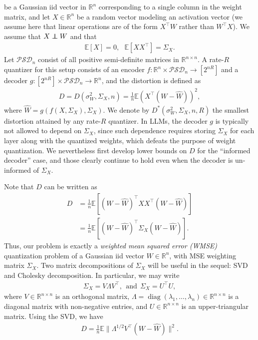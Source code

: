\documentclass[journal]{IEEEtran}
\newcommand{\RR}{\mathbb{R}}
\newcommand{\diag}{\mathop{\mathrm{diag}}}
\newcommand\indep{\protect\mathpalette{\protect\independenT}{\perp}}
\def\independenT#1#2{\mathrel{\rlap{$#1#2$}\mkern2mu{#1#2}}}
\def\EE{\mathbb{E}}
\newcommand{\m}{\mathcal}
\begin{document}
\iffalse

	be a Gaussian iid vector in $\RR^n$ corresponding to a single column in the weight matrix, and let $X\in\RR^{n}$ be a random vector modeling an activation vector (we assume here that linear operations are of the form $X^\top W$ rather than $W^\top X$). We assume that $X\indep W$ and that
	\begin{align}
	\EE[X]=0,~~~\EE[X X^\top]=\Sigma_X.    
	\end{align}
	Let $\m{PSD}_n$ consist of all positive semi-definite matrices in $\RR^{n\times n}$. A rate-$R$ quantizer for this setup consists of an encoder $f:\RR^n\times\m{PSD}_n\to[2^{nR}]$ and a decoder $g:[2^{nR}]\times \m{PSD}_n\to\RR^n$, and the distortion is defined as
	\begin{align}
	D=D(\sigma_W^2,\Sigma_X,n)=\frac{1}{n}\EE\left(X^\top (W-\hat{W})\right)^2,   
	\end{align}
	where $\hat{W}=g(f(X,\Sigma_X),\Sigma_X)$.
	We denote by $D^*(\sigma_W^2,\Sigma_X,n,R)$ the smallest distortion attained by any rate-$R$ quantizer.
	In LLMs, the decoder $g$ is typically not allowed to depend on $\Sigma_X$, since such dependence requires storing $\Sigma_X$ for each layer along with the quantized weights, which defeats the purpose of weight quantization. We nevertheless first develop lower bounds on $D$ for the ``informed decoder'' case, and those clearly continue to hold even when the decoder is un-informed of $\Sigma_X$.

	Note that $D$ can be written as
	\begin{align}
	D&=\frac{1}{n}\EE[(W-\hat{W})^\top X X^\top (W-\hat{W})]\nonumber\\
	&=\frac{1}{n}\EE[(W-\hat{W})^\top \Sigma_X (W-\hat{W})].    
	\label{eq:DwmseDef}
	\end{align}
	Thus, our problem is exactly a \emph{weighted mean squared error (WMSE)} quantization problem of a Gaussian iid vector $W\in\RR^n$, with MSE weighting matrix $\Sigma_X$.
	Two matrix decompositions of $\Sigma_X$ will be useful in the sequel: SVD and Cholesky decomposition. In particular, we may write
	\begin{align}
	\Sigma_X=V \Lambda V^\top,~~\text{and}~~\Sigma_X=U^\top U, 
	\label{eq:SxDecompositions}
	\end{align}
	where $V\in\RR^{n\times n}$ is an orthogonal matrix, $\Lambda=\diag(\lambda_1,\ldots,\lambda_n)\in\RR^{n\times n}$ is a diagonal matrix with non-negative entries, and $U\in\RR^{n\times n}$ is an upper-triangular matrix. Using the SVD, we have
	\begin{align}
	D=\frac{1}{n}\EE\|\Lambda^{1/2}V^\top(W-\hat{W})\|^2.    
	\end{align}
\end{document}
